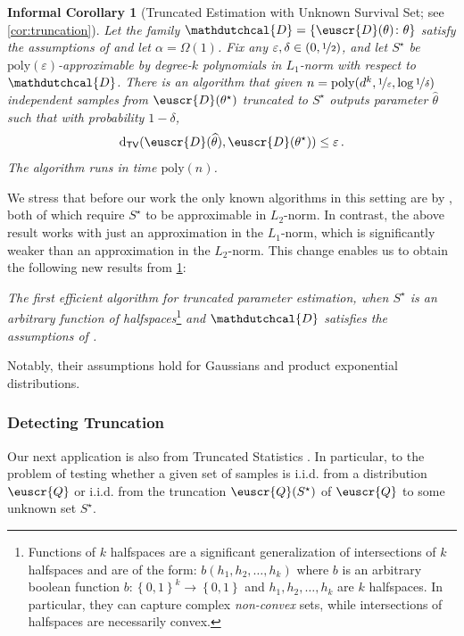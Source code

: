 \documentclass[11pt]{article}
\theoremstyle{plain}
\newtheorem{infcorollary}[theorem]{Informal Corollary}
\theoremstyle{definition}
\theoremstyle{remark}
\newcommand{\sinparen}[1]{(#1)}
\newcommand{\inbrace}[1]{\left\{#1\right\}}
\newcommand{\tv}[2]{\operatorname{d}_{\mathsf{TV}}\sinparen{#1,#2}}
\newcommand{\zo}{\ensuremath{\inbrace{0, 1}}}
\newcommand{\nfrac}[2]{\nicefrac{#1}{#2}}
\newcommand{\poly}{\mathrm{poly}}
\newcommand{\iid}{i.i.d.}
\newcommand{\eps}{\varepsilon}
\newcommand{\wh}[1]{\widehat{#1}}
\newcommand{\customcal}[1]{\euscr{#1}}
\newcommand{\cD}{\customcal{D}}
\newcommand{\cQ}{\customcal{Q}}
\newcommand{\hypo}[1]{\mathdutchcal{#1}}
\newcommand{\hyD}{\hypo{D}}
\newcommand{\nL}{L}
\begin{document}
         
        \begin{infcorollary}[Truncated Estimation with Unknown Survival Set; see \cref{cor:truncation}]\label{infcor:truncation} 
            Let the family $\hyD=\inbrace{\cD(\theta)\colon \theta}$ satisfy the assumptions of \cite{lee2024unknown} and let $\alpha=\Omega(1)$. %
            Fix any $\eps, \delta \in (0, \nfrac{1}{2})$, and let $S^\star$ be $\poly(\eps)$-approximable by degree-$k$ polynomials in $\nL_1$-norm with respect to $\hyD$.
            There is an algorithm that given $n = \poly(d^k, \nfrac{1}{\eps}, \log{\nfrac{1}{\delta}})$ independent samples from $\cD(\theta^\star)$ truncated to $S^\star$ 
            outputs parameter $\wh{\theta}$ such that with probability $1-\delta$, 
            \[ \tv{\cD(\wh{\theta})}{\cD(\theta^\star)} \leq \eps\,.\]
            The algorithm runs in time $\poly(n)$. 
        \end{infcorollary} 
        We stress that before our work the only known algorithms in this setting are by \cite{Kontonis2019EfficientTS,lee2024unknown}, both of which require $S^\star$ to be approximable in $\nL_2$-norm.
        In contrast, the above result works with just an approximation in the $\nL_1$-norm, which is significantly weaker than an approximation in the $\nL_2$-norm.
        This change enables us to obtain the following new results from \cref{infcor:truncation}:
        \begin{center}
            \textit{The first efficient algorithm for truncated parameter estimation, when $S^\star$ is an arbitrary function of halfspaces}\footnote{
                Functions of $k$ halfspaces are a significant generalization of intersections of $k$ halfspaces and are of the form:
                $b(h_1,h_2,\dots,h_k)$ where $b$ is an arbitrary boolean function $b\colon \zo^k\to \zo$ and $h_1,h_2,\dots,h_k$ are $k$ halfspaces.
                In particular, they can capture complex \textit{non-convex} sets, while intersections of halfspaces are necessarily convex.
                } \textit{and $\hyD$ satisfies the assumptions of \cite{lee2024unknown}.}
        \end{center}
        Notably, their assumptions hold for Gaussians and product exponential distributions.


        
    \subsubsection{Detecting Truncation}\label{sec:intro:application:detection}
        Our next application is also from Truncated Statistics \cite{Cohen91,maddala1983limited}.
        In particular, to the problem of testing whether a given set of samples is \iid{} from a distribution $\cQ$ or \iid{} from the truncation $\cQ(S^\star)$ of $\cQ$ to some unknown set $S^\star$.
        
\end{document}
